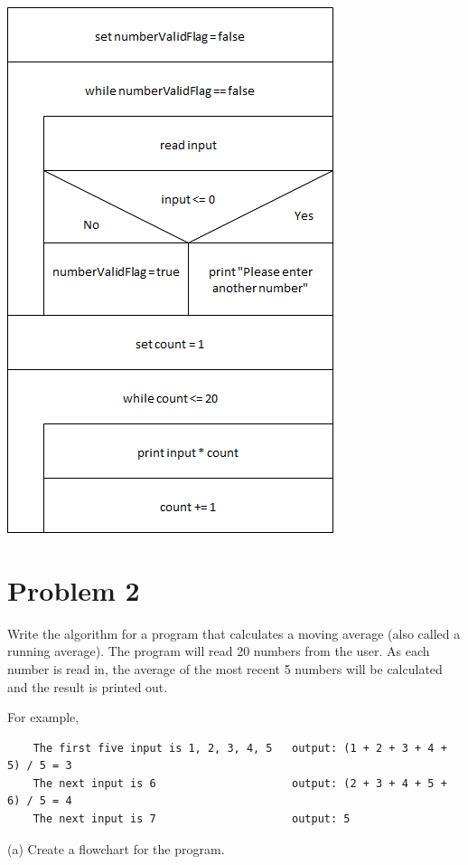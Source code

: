 \documentclass{article}
\begin{document}
    \begin{center}
        \includegraphics[scale=0.5]{problem1_c.png}
    \end{center}

    \section*{Problem 2}

    Write the algorithm for a program that calculates a moving average (also called a
    running average). The program will read 20 numbers from the user. As each number is
    read in, the average of the most recent 5 numbers will be calculated and the result is
    printed out.

    For example,

    \begin{verbatim}
    The first five input is 1, 2, 3, 4, 5   output: (1 + 2 + 3 + 4 + 5) / 5 = 3
    The next input is 6                     output: (2 + 3 + 4 + 5 + 6) / 5 = 4
    The next input is 7                     output: 5
    \end{verbatim}

    (a) Create a flowchart for the program.
\end{document}
